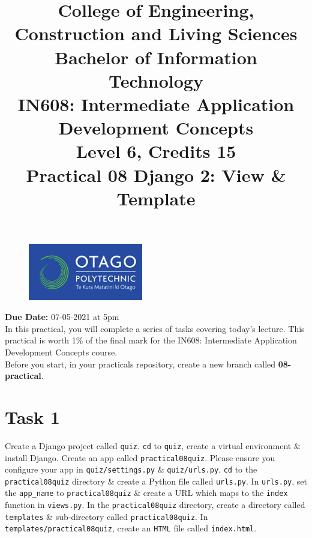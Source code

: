 \documentclass{article}
\author{}
\begin{document}
\begin{figure}
	\centering
	\includegraphics[width=50mm]{./img/logo.png}
\end{figure}

\title{College of Engineering, Construction and Living Sciences\\Bachelor of Information Technology\\IN608: Intermediate Application Development Concepts\\Level 6, Credits 15\\\textbf{Practical 08 Django 2: View \& Template}} 
\date{}
\maketitle

\textbf{Due Date:} 07-05-2021 at 5pm \\

In this practical, you will complete a series of tasks covering today's lecture. This practical is worth 1\% of the final mark for the IN608: Intermediate Application Development Concepts course. \\

Before you start, in your practicals repository, create a new branch called \textbf{08-practical}.

\section*{Task 1} 
Create a Django project called \texttt{quiz}. \texttt{cd} to \texttt{quiz}, create a virtual environment \& install Django. Create an app called \texttt{practical08quiz}. Please ensure you configure your app in \texttt{quiz/settings.py} \& \texttt{quiz/urls.py}. \texttt{cd} to the \texttt{practical08quiz} directory \& create a Python file called \texttt{urls.py}. In \texttt{urls.py}, set the \texttt{app\_name} to \texttt{practical08quiz} \& create a URL which maps to the \texttt{index} function in \texttt{views.py}. In the \texttt{practical08quiz} directory, create a directory called \texttt{templates} \& sub-directory called \texttt{practical08quiz}. In \texttt{templates/practical08quiz}, create an \texttt{HTML} file called \texttt{index.html}. \\
\end{document}
